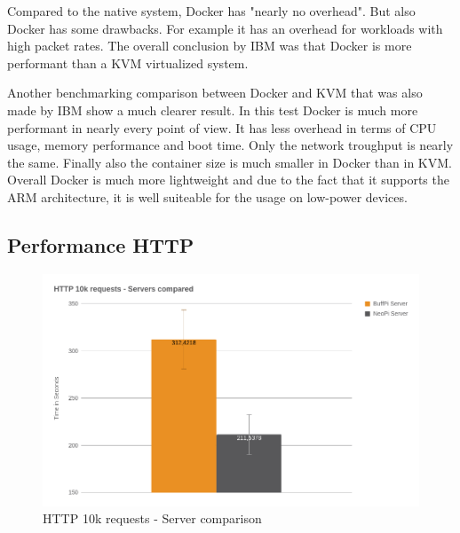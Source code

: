 Compared to the native system, Docker has "nearly no overhead"\autocite[p. 6]{IBM:Performance:2014}.
But also Docker has some drawbacks.
For example it has an overhead for workloads with high packet rates.\autocite[cf.][p. 6]{IBM:Performance:2014}
The overall conclusion by IBM was that Docker is more performant than a \ac{KVM} virtualized system.

Another benchmarking comparison\autocite{Russell:Performance:2014} between Docker and \ac{KVM} that was also made by IBM show a much clearer result.
In this test Docker is much more performant in nearly every point of view.
It has less overhead in terms of \ac{CPU} usage\autocite[cf.][p. 25]{Russell:Performance:2014}, memory performance\autocite[cf.][p. 50]{Russell:Performance:2014} and boot time\autocite[cf.][p. 24]{Russell:Performance:2014}.
Only the network troughput is nearly the same.\autocite[cf.][p. 52]{Russell:Performance:2014}
Finally also the container size is much smaller in Docker than in \ac{KVM}.\autocite[cf.][p. 66]{Russell:Performance:2014}
Overall Docker is much more lightweight and due to the fact that it supports the ARM architecture, it is well suiteable for the usage on low-power devices.

\subsection{Performance HTTP}


\begin{figure}[H]
    \centering
    \includegraphics[width=\textwidth]{resources/images/performance_http_server_comparison.png}
    \caption[HTTP 10k requests - Server comparison]{HTTP 10k requests - Server comparison}
    \label{fig:performance_http_server_comparison}
\end{figure}

